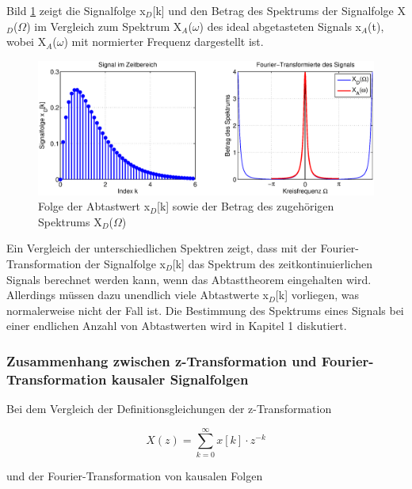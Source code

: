 \noindent Bild \ref{fig:VergleichSpektrumSignaleFolgen3} zeigt die Signalfolge x${}_{D}$[k] und den Betrag des Spektrums der Signalfolge {\textbar}X${}_{D}$($\Omega$){\textbar} im Vergleich zum Spektrum X${}_{A}$($\omega$) des ideal abgetasteten Signals x${}_{A}$(t), wobei X${}_{A}$($\omega$) mit normierter Frequenz dargestellt ist.

\begin{figure}[H]
  \centerline{\includegraphics[width=1\textwidth]{Kapitel7/Bilder/image17.eps}}
  \caption{Folge der Abtastwert x${}_{D}$[k] sowie der Betrag des zugeh\"{o}rigen Spektrums {\textbar}X${}_{D}$($\Omega$){\textbar}}
  \label{fig:VergleichSpektrumSignaleFolgen3}
\end{figure}

\noindent Ein Vergleich der unterschiedlichen Spektren zeigt, dass mit der Fourier-Transformation der Signalfolge x${}_{D}$[k] das Spektrum des zeitkontinuierlichen Signals berechnet werden kann, wenn das Abtasttheorem eingehalten wird. Allerdings m\"{u}ssen dazu unendlich viele Abtastwerte x${}_{D}$[k] vorliegen, was normalerweise nicht der Fall ist. Die Bestimmung des Spektrums eines Signals bei einer endlichen Anzahl von Abtastwerten wird in Kapitel 1 diskutiert.

\subsubsection{Zusammenhang zwischen z-Transformation und Fourier-Transformation kausaler Signalfolgen}

\noindent Bei dem Vergleich der Definitionsgleichungen der z-Transformation 

\begin{equation}\label{eq:sevenonehundredfour}
X\left(z\right)=\sum _{k=0}^{\infty }x\left[k\right]\cdot z^{-k}
\end{equation}

\noindent und der Fourier-Transformation von kausalen Folgen 


